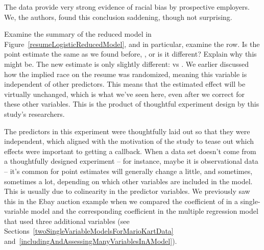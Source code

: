 The data provide very strong evidence of racial bias
by prospective employers.
We, the authors, found this conclusion saddening,
though not surprising.

\begin{examplewrap}
\begin{nexample}{Examine the summary of the reduced model
    in Figure~\ref{resumeLogisticReducedModel},
    and in particular, examine the  row.
    Is the point estimate the same as we found before,
    \resRaceWhiteCoefReduced{}, or is it different?
    Explain why this might be.}
  The new estimate is only slightly different:
  \resRaceWhiteCoefReduced{} vs \resRaceWhiteCoef{}.
  We earlier discussed how the implied race on the resume
  was randomized, meaning this variable is independent of
  other predictors.
  This means that the estimated effect will be virtually
  unchanged, which is what we've seen here, even after we
  correct for these other variables.
  This is the product of thoughtful experiment design
  by this study's researchers.
\end{nexample}
\end{examplewrap}

The predictors in this experiment were thoughtfully
laid out so that they were independent,
which aligned with the motivation of the study to tease
out which effects were important to getting a callback.
When a data set doesn't come from a thoughtfully designed
experiment -- for instance, maybe it is observational data --
it's common for point estimates will generally change a little,
and sometimes, sometimes a lot, depending on which other
variables are included in the model.
This is usually due to colinearity in the predictor variables.
We previously saw this in the Ebay auction example when we compared the coefficient of  in a single-variable model and the corresponding coefficient in the multiple regression model that used three additional variables (see Sections~\ref{twoSingleVariableModelsForMarioKartData} and~\ref{includingAndAssessingManyVariablesInAModel}).

